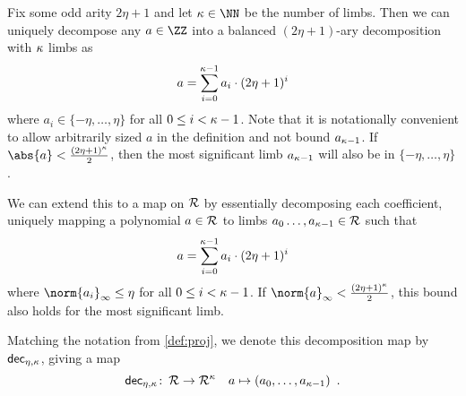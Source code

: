 \begin{definition}\label{def:decomp_R}
    Fix some odd arity $2\eta+1$ and let $\limbs\in\NN$ be the number of limbs.
    Then we can uniquely decompose any $a\in\ZZ$ into a balanced $(2\eta+1)$-ary decomposition with $\kappa$ limbs as
    \[
     a = \sum_{i=0}^{\kappa-1} a_i \cdot (2\eta+1)^i
    \]
    where $a_i \in \{-\eta,\ldots, \eta\}$ for all $0\leq i <\kappa-1$.
    Note that it is notationally convenient to allow arbitrarily sized $a$ in the definition and not bound $a_{\kappa-1}$.
    If $\abs{a} < \tfrac{(2\eta+1)^\limbs}{2}$, then the most significant limb $a_{\kappa-1}$ will also be in $\{-\eta,\ldots,\eta\}$.
    
    We can extend this to a map on $\mathcal{R}$ by essentially decomposing each coefficient, uniquely mapping a polynomial $a\in\mathcal{R}$ to limbs $a_0\ldots,a_{\kappa-1}\in \mathcal{R}$ such that
    \[
     a = \sum_{i=0}^{\kappa-1} a_i \cdot (2\eta+1)^i
    \]
    where $\norm{a_i}_{\infty} \leq \eta$ for all $0\leq i < \kappa-1$. If $\norm{a}_{\infty} < \tfrac{(2\eta+1)^\limbs}{2}$, this bound also holds for the most significant limb.
    
    Matching the notation from \autoref{def:proj}, we denote this decomposition map by $\mathsf{dec}_{\eta,\kappa}$, giving a map
    \[
     \mathsf{dec}_{\eta,\kappa} \colon\, \mathcal{R} \to \mathcal{R}^{\kappa}\quad a \mapsto (a_0,\ldots,a_{\kappa-1})\enspace.
    \]
\end{definition}
